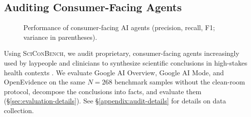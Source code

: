 \documentclass{article}
\begin{document}
\subsection{Auditing Consumer-Facing Agents} %


\begin{figure}
\vspace{-32pt}
\centering
\footnotesize
\setlength{\tabcolsep}{2pt}
\caption{Performance of consumer-facing AI agents (precision, recall, F1; variance in parentheses).}
\label{tab:consumer-agents}
\vspace{-10pt}
\end{figure}


Using \textsc{SciConBench}, we audit proprietary, consumer-facing agents increasingly used by laypeople and clinicians to synthesize scientific conclusions in high-stakes health contexts \cite{annenberg_asaph_2024, openevidence2026million, nytimes_google_ai_health_2024}. We evaluate Google AI Overview, Google AI Mode, and OpenEvidence on the same $N=268$ benchmark samples without the clean-room protocol, decompose the conclusions into facts, and evaluate them (\S\ref{sec:evaluation-details}). See \S\ref{appendix:audit-details} for details on data collection. 
\end{document}

